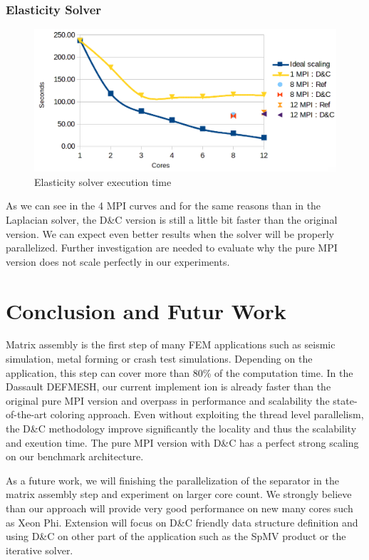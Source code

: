 \documentclass{IOS-Book-Article}
\begin{document}
\subsubsection{Elasticity Solver}
\begin{figure}[htp]
 \centering
 \label{fig9}
 \includegraphics[scale=0.2]{Elasticity_solver_time.png}
 \caption{Elasticity solver execution time}
\end{figure}
As we can see in the 4 MPI curves and for the same reasons than in the Laplacian solver, the D\&C version is still a little bit faster than the original version.
We can expect even better results when the solver will be properly parallelized.
Further investigation are needed to evaluate why the pure MPI version does not scale perfectly in our experiments.

\section{Conclusion and Futur Work}

Matrix assembly is the first step of many FEM applications such as seismic simulation, metal forming or crash test simulations. Depending on the application, this step can cover more than 80\% of the computation time. In the Dassault DEFMESH, our current implement ion is already faster than the original pure MPI version and overpass in performance and scalability the state-of-the-art  coloring approach. Even without exploiting the thread level parallelism, the D\&C methodology improve significantly the locality and thus the scalability and exeution time. The pure MPI version with D\&C has a perfect strong scaling on our benchmark architecture.

As a future work,  we will finishing the parallelization of the separator in the matrix assembly step and experiment on larger core count. We strongly believe than our approach will provide very good performance on new many cores such as Xeon Phi. Extension will focus on D\&C friendly data structure definition and using D\&C on other part of the application such as the SpMV product or the iterative solver. 



\end{document}
